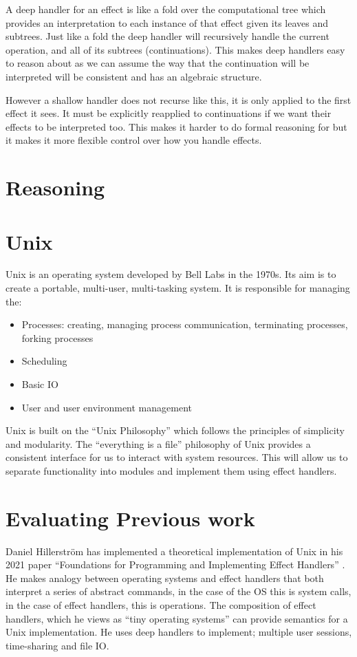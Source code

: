 \documentclass[logo,bsc,singlespacing,parskip]{infthesis}
\begin{document}
A deep handler for an effect is like a fold over the computational tree which provides an interpretation to each instance of that effect given its leaves and subtrees. Just like a fold the deep handler will recursively handle the current operation, and all of its subtrees (continuations). This makes deep handlers easy to reason about as we can assume the way that the continuation will be interpreted will be consistent and has an algebraic structure.

However a shallow handler does not recurse like this, it is only applied to the first effect it sees. It must be explicitly reapplied to continuations if we want their effects to be interpreted too. This makes it harder to do formal reasoning for but it makes it more flexible control over how you handle effects.

\section{Reasoning}


\section{Unix}
Unix is an operating system developed by Bell Labs in the 1970s. Its aim is to create a portable, multi-user, multi-tasking system. It is responsible for managing the:
\begin{itemize}
    \item Processes: creating, managing process communication, terminating processes, forking processes
    \item Scheduling
    \item Basic IO
    \item User and user environment management
\end{itemize}

Unix is built on the “Unix Philosophy” which follows the principles of simplicity and modularity. The “everything is a file” philosophy of Unix provides a consistent interface for us to interact with system resources. This will allow us to separate functionality into modules and implement them using effect handlers.

\section{Evaluating Previous work}
Daniel Hillerström has implemented a theoretical implementation of Unix in his 2021 paper “Foundations for Programming and Implementing Effect Handlers” \cite{hillerstrom_foundations_nodate}. He makes analogy between operating systems and effect handlers that both interpret a series of abstract commands, in the case of the OS this is system calls, in the case of effect handlers, this is operations. The composition of effect handlers, which he views as “tiny operating systems” can provide semantics for a Unix implementation. He uses deep handlers to implement; multiple user sessions, time-sharing and file IO.
\end{document}
